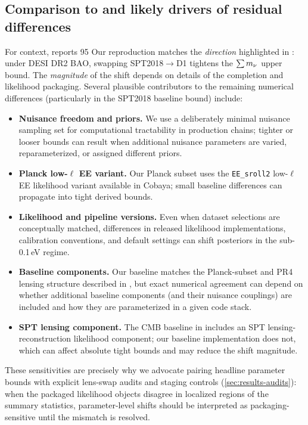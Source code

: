 \subsection{Comparison to \cite{arxiv2601_16277} and likely drivers of residual differences}
For context, \cite{arxiv2601_16277} reports 95%
Our reproduction matches the \emph{direction} highlighted in \cite{arxiv2601_16277}: under DESI DR2 BAO, swapping SPT2018$\rightarrow$D1 tightens the $\sum m_\nu$ upper bound. The \emph{magnitude} of the shift depends on details of the completion and likelihood packaging. Several plausible contributors to the remaining numerical differences (particularly in the SPT2018 baseline bound) include:
\begin{itemize}[leftmargin=*, itemsep=2pt]
  \item \textbf{Nuisance freedom and priors.} We use a deliberately minimal nuisance sampling set for computational tractability in production chains; tighter or looser bounds can result when additional nuisance parameters are varied, reparameterized, or assigned different priors.
  \item \textbf{Planck low-$\ell$ EE variant.} Our Planck subset uses the \texttt{EE\_sroll2} low-$\ell$ EE likelihood variant available in Cobaya; small baseline differences can propagate into tight derived bounds.
  \item \textbf{Likelihood and pipeline versions.} Even when dataset selections are conceptually matched, differences in released likelihood implementations, calibration conventions, and default settings can shift posteriors in the sub-0.1\,eV regime.
  \item \textbf{Baseline components.} Our baseline matches the Planck-subset and PR4 lensing structure described in \cite{arxiv2601_16277}, but exact numerical agreement can depend on whether additional baseline components (and their nuisance couplings) are included and how they are parameterized in a given code stack.
  \item \textbf{SPT lensing component.} The CMB baseline in \cite{arxiv2601_16277} includes an SPT lensing-reconstruction likelihood component; our baseline implementation does not, which can affect absolute tight bounds and may reduce the shift magnitude.
\end{itemize}
These sensitivities are precisely why we advocate pairing headline parameter bounds with explicit lens-swap audits and staging controls (\cref{sec:results-audits}): when the packaged likelihood objects disagree in localized regions of the summary statistics, parameter-level shifts should be interpreted as packaging-sensitive until the mismatch is resolved.

